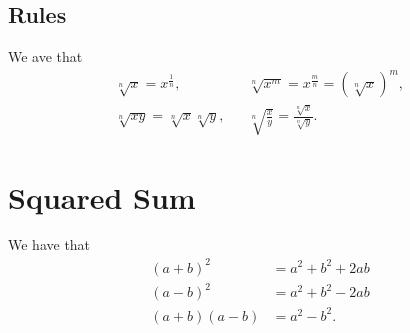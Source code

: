 \subsection{Rules}
We ave that
\begin{align*}
\sqrt[n]{x}=x^{\frac{1}{n}},&& \sqrt[n]{x^m}=x^{\frac{m}{n}}=(\sqrt[n]{x})^m,\\
\sqrt[n]{xy}=\sqrt[n]{x}\sqrt[n]{y},&& \sqrt[n]{\frac{x}{y}}=\frac{\sqrt[n]{x}}{\sqrt[n]{y}}.
\end{align*}

\section{Squared Sum}
We have that
\begin{align*}
(a+b)^2&=a^2+b^2+2ab\\
(a-b)^2&=a^2+b^2-2ab\\
(a+b)(a-b)&=a^2-b^2.
\end{align*}